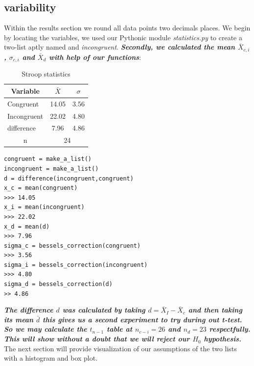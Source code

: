 \documentclass[8pt]{article}
\newcommand{\8}{\bar}
\begin{document}
\subsection{variability} 
Within the results section we round all data points two decimals places. We begin by locating the variables, we used our Pythonic module \textit{statistics.py} to create a two-list aptly named  and \textit{incongruent}. \textbf{\textit{Secondly, we calculated the mean $\bar{X}_{c,i}$, $\sigma_{c,i}$ and $\bar{X}_{d}$ with help of our functions}}: 
\begin{table}[htbp]\centering \caption{Stroop statistics \label{sumstat}}
\begin{tabular}{l c c  }\hline\hline
\multicolumn{1}{c}{\textbf{Variable}} & $\bar{X}$ & $\sigma$ \\ \hline
Congruent & 14.05 & 3.56  \\
Incongruent & 22.02 & 4.80  \\
difference & 7.96 & 4.86 \\ 
\multicolumn{1}{c}{n} & \multicolumn{2}{c}{24}\\ \hline
\end{tabular}
\end{table}
\small{\begin{verbatim}
congruent = make_a_list() 
incongruent = make_a_list() 
d = difference(incongruent,congruent) 
x_c = mean(congruent) 
>>> 14.05
x_i = mean(incongruent)
>>> 22.02 
x_d = mean(d) 
>>> 7.96
sigma_c = bessels_correction(congruent) 
>>> 3.56
sigma_i = bessels_correction(incongruent) 
>>> 4.80 
sigma_d = bessels_correction(d) 
>> 4.86 
\end{verbatim}}
\noindent\textbf{\textit{The difference $d$ was calculated by taking $d = \bar{X}_{I} - \bar{X}_{c}$ and then taking its mean $\bar{d}$ this gives us a second experiment to try during out t-test. So we may calculate the $t_{n-1}$ table at $n_{c-i} = 26$ and $n_{d} = 23$ respectfully. This will show without a doubt that we will reject our $H_{0}$ hypothesis.}} The next section will provide visualization of our assumptions of the two lists with a histogram and box plot. 
\end{document}
